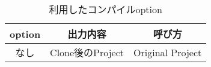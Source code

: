 \begin{table}[h]
  \caption{利用したコンパイルoption}
  \label{table:compile_option}
  \begin{tabular}{ccc}
    \hline
    option & 出力内容 & 呼び方 \\
    \hline \hline
    なし & Clone後のProject & Original Project \\
    \hline
  \end{tabular}
\end{table}
